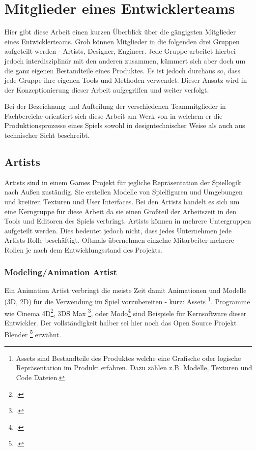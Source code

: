 \documentclass[pagesize, paper=a4, fontsize=12pt,titlepage=true, headings=small, headnosepline, abstractoff, liststotoc, nochapterprefix, plainheadsepline, twoside]{scrreprt}
\begin{document}
\section{Mitglieder eines Entwicklerteams}
Hier gibt diese Arbeit einen kurzen Überblick über die gängigsten Mitglieder eines Entwicklerteams. Grob können Mitglieder in die folgenden drei Gruppen aufgeteilt werden - Artists, Designer, Engineer. Jede Gruppe arbeitet hierbei jedoch interdisziplinär mit den anderen zusammen, kümmert sich aber doch um die ganz eigenen Bestandteile eines Produktes. Es ist jedoch durchaus so, dass jede Gruppe ihre eigenen Tools und Methoden verwendet. Dieser Ansatz wird in der Konzeptionierung dieser Arbeit aufgegriffen und weiter verfolgt.

Bei der Bezeichnung und Aufteilung der verschiedenen Teammitglieder in Fachbereiche orientiert sich diese Arbeit am Werk von \autocite{Chandler2006} in welchem er die Produktionsprozesse eines Spiels sowohl in designtechnischer Weise als auch aus technischer Sicht beschreibt.

\subsection{Artists}
Artists sind in einem Games Projekt für jegliche Repräsentation der Spiellogik nach Außen zuständig. Sie erstellen Modelle von Spielfiguren und Umgebungen und kreiiren Texturen und User Interfaces. Bei den Artists handelt es sich um eine Kerngruppe für diese Arbeit da sie einen Großteil der Arbeitszeit in den Tools und Editoren des Spiels verbringt. Artists können in mehrere Untergruppen aufgeteilt werden. Dies bedeutet jedoch nicht, dass jedes Unternehmen jede Artists Rolle beschäftigt. Oftmals übernehmen einzelne Mitarbeiter mehrere Rollen je nach dem Entwicklungsstand des Projekts.
\subsubsection{Modeling/Animation Artist}
Ein Animation Artist verbringt die meiste Zeit damit Animationen und Modelle (3D, 2D) für die Verwendung im Spiel vorzubereiten - kurz: Assets \footnote{Assets sind Bestandteile des Produktes welche eine Grafische oder logische Repräsentation im Produkt erfahren. Dazu zählen z.B. Modelle, Texturen und Code Dateien.}. Programme wie Cinema 4D\footcite{MaxonC4d2014}, 3DS Max \footcite{AutodeskMax2014}, oder Modo\footcite{FoundryModo2014} sind Beispiele für Kernsoftware dieser Entwickler. Der vollständigkeit halber sei hier noch das Open Source Projekt Blender \footcite{Blender2015} erwähnt.
\end{document}

